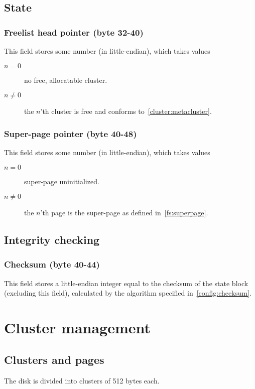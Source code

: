 \documentclass[11pt,a4paper]{report}
\newcommand{\clustersize}{512 }
\begin{document}
    \section{State}
        \subsection{Freelist head pointer (byte 32-40)}
        This field stores some number (in little-endian), which takes values

        \begin{description}
            \item [$n = 0$]    no free, allocatable cluster.
            \item [$n \neq 0$] the $n$'th cluster is free and conforms
                to~\ref{cluster:metacluster}.
        \end{description}

        \subsection{Super-page pointer (byte 40-48)}
        This field stores some number (in little-endian), which takes values

        \begin{description}
            \item [$n = 0$]    super-page uninitialized.
            \item [$n \neq 0$] the $n$'th page is the super-page as defined
                in~\ref{fs:superpage}.
        \end{description}

    \section{Integrity checking}
        \subsection{Checksum (byte 40-44)}
        This field stores a little-endian integer equal to the checksum of the
        state block (excluding this field), calculated by the algorithm
        specified in~\ref{config:checksum}.

    \chapter{Cluster management}

    \section{Clusters and pages}
        The disk is divided into clusters of \clustersize bytes each.
\end{document}
